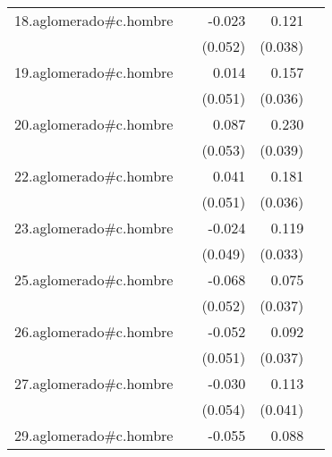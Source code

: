 {\begin{longtable}{l*{4}{D{.}{.}{-1}}}
\addlinespace
18.aglomerado#c.hombre&                     &      -0.023         &       0.121\sym{**} &                     \\
            &                     &     (0.052)         &     (0.038)         &                     \\
\addlinespace
19.aglomerado#c.hombre&                     &       0.014         &       0.157\sym{***}&                     \\
            &                     &     (0.051)         &     (0.036)         &                     \\
\addlinespace
20.aglomerado#c.hombre&                     &       0.087         &       0.230\sym{***}&                     \\
            &                     &     (0.053)         &     (0.039)         &                     \\
\addlinespace
22.aglomerado#c.hombre&                     &       0.041         &       0.181\sym{***}&                     \\
            &                     &     (0.051)         &     (0.036)         &                     \\
\addlinespace
23.aglomerado#c.hombre&                     &      -0.024         &       0.119\sym{***}&                     \\
            &                     &     (0.049)         &     (0.033)         &                     \\
\addlinespace
25.aglomerado#c.hombre&                     &      -0.068         &       0.075\sym{*}  &                     \\
            &                     &     (0.052)         &     (0.037)         &                     \\
\addlinespace
26.aglomerado#c.hombre&                     &      -0.052         &       0.092\sym{*}  &                     \\
            &                     &     (0.051)         &     (0.037)         &                     \\
\addlinespace
27.aglomerado#c.hombre&                     &      -0.030         &       0.113\sym{**} &                     \\
            &                     &     (0.054)         &     (0.041)         &                     \\
\addlinespace
29.aglomerado#c.hombre&                     &      -0.055         &       0.088\sym{**} &                     \\

\end{longtable}}
